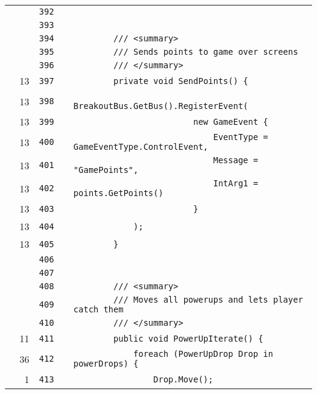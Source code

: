 \documentclass[a4paper,landscape,10pt]{article}
\begin{document}
\begin{longtable}[l]{lrrll}
\cellcolor{gray} &  & \verb~392~ & & \verb~~\\
\cellcolor{gray} &  & \verb~393~ & & \verb~~\\
\cellcolor{gray} &  & \verb~394~ & & \verb~        /// <summary>~\\
\cellcolor{gray} &  & \verb~395~ & & \verb~        /// Sends points to game over screens~\\
\cellcolor{gray} &  & \verb~396~ & & \verb~        /// </summary>~\\
\cellcolor{green} & 13 & \verb~397~ & & \verb~        private void SendPoints() {~\\
\cellcolor{green} & 13 & \verb~398~ & & \verb~            BreakoutBus.GetBus().RegisterEvent(~\\
\cellcolor{green} & 13 & \verb~399~ & & \verb~                        new GameEvent {~\\
\cellcolor{green} & 13 & \verb~400~ & & \verb~                            EventType = GameEventType.ControlEvent,~\\
\cellcolor{green} & 13 & \verb~401~ & & \verb~                            Message = "GamePoints",~\\
\cellcolor{green} & 13 & \verb~402~ & & \verb~                            IntArg1 = points.GetPoints()~\\
\cellcolor{green} & 13 & \verb~403~ & & \verb~                        }~\\
\cellcolor{green} & 13 & \verb~404~ & & \verb~            );~\\
\cellcolor{green} & 13 & \verb~405~ & & \verb~        }~\\
\cellcolor{gray} &  & \verb~406~ & & \verb~~\\
\cellcolor{gray} &  & \verb~407~ & & \verb~~\\
\cellcolor{gray} &  & \verb~408~ & & \verb~        /// <summary>~\\
\cellcolor{gray} &  & \verb~409~ & & \verb~        /// Moves all powerups and lets player catch them~\\
\cellcolor{gray} &  & \verb~410~ & & \verb~        /// </summary>~\\
\cellcolor{green} & 11 & \verb~411~ & & \verb~        public void PowerUpIterate() {~\\
\cellcolor{green} & 36 & \verb~412~ & & \verb~            foreach (PowerUpDrop Drop in powerDrops) {~\\
\cellcolor{green} & 1 & \verb~413~ & & \verb~                Drop.Move();~\\

\end{longtable}
\end{document}
